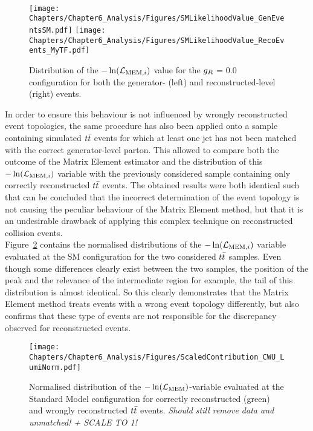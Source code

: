 \\
\begin{figure}[h!t]
 \centering
 \texttt{[image: Chapters/Chapter6\_Analysis/Figures/SMLikelihoodValue\_GenEventsSM.pdf]} \hspace{0.3cm}
 \texttt{[image: Chapters/Chapter6\_Analysis/Figures/SMLikelihoodValue\_RecoEvents\_MyTF.pdf]}
 \caption{Distribution of the $-\ln(\mathcal{L}_{\textrm{MEM}, i})$ value for the $g_{R}$ = $0.0$ configuration for both the generator- (left) and reconstructed-level (right) events.} \label{fig::SMLik}
\end{figure}

In order to ensure this behaviour is not influenced by wrongly reconstructed event topologies, the same procedure has also been applied onto a sample containing simulated $t\bar{t}$ events for which at least one jet has not been matched with the correct generator-level parton.
This allowed to compare both the outcome of the Matrix Element estimator and the distribution of this $-\ln(\mathcal{L}_{\textrm{MEM}, i})$ variable with the previously considered sample containing only correctly reconstructed $t\bar{t}$ events.
The obtained results were both identical such that can be concluded that the incorrect determination of the event topology is not causing the peculiar behaviour of the Matrix Element method, but that it is an undesirable drawback of applying this complex technique on reconstructed collision events.
\\
Figure~\ref{fig::SMLikCorrVSWr} contains the normalised distributions of the $-\ln(\mathcal{L}_{\textrm{MEM}, i})$ variable evaluated at the SM configuration for the two considered $t\bar{t}$ samples.
Even though some differences clearly exist between the two samples, the position of the peak and the relevance of the intermediate region for example, the tail of this distribution is almost identical.
So this clearly demonstrates that the Matrix Element method treats events with a wrong event topology differently, but also confirms that these type of events are not responsible for the discrepancy observed for reconstructed events.
\\
\begin{figure}[h!t]
 \centering
 \texttt{[image: Chapters/Chapter6\_Analysis/Figures/ScaledContribution\_CWU\_LumiNorm.pdf]}
 \caption{Normalised distribution of the $-\ln(\mathcal{L}_{\textrm{MEM}})$-variable evaluated at the Standard Model configuration for correctly reconstructed (green) and wrongly reconstructed $t\bar{t}$ events. \textit{Should still remove data and unmatched! + SCALE TO 1!}} \label{fig::SMLikCorrVSWr}
\end{figure}

